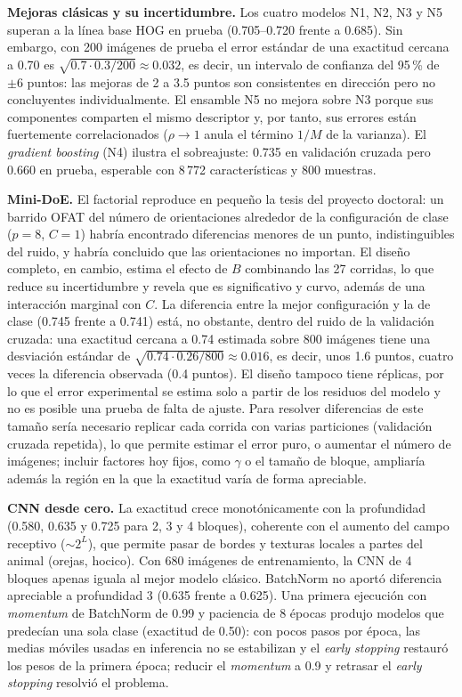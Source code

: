 \documentclass[conference]{IEEEtran}
\begin{document}
\textbf{Mejoras clásicas y su incertidumbre.} Los cuatro modelos N1, N2, N3 y N5 superan a la línea base HOG en prueba (0.705--0.720 frente a 0.685). Sin embargo, con 200 imágenes de prueba el error estándar de una exactitud cercana a 0.70 es $\sqrt{0.7\cdot0.3/200}\approx0.032$, es decir, un intervalo de confianza del 95\,\% de $\pm6$ puntos: las mejoras de 2 a 3.5 puntos son consistentes en dirección pero no concluyentes individualmente. El ensamble N5 no mejora sobre N3 porque sus componentes comparten el mismo descriptor y, por tanto, sus errores están fuertemente correlacionados ($\rho\to1$ anula el término $1/M$ de la varianza). El \emph{gradient boosting} (N4) ilustra el sobreajuste: 0.735 en validación cruzada pero 0.660 en prueba, esperable con 8\,772 características y 800 muestras.

\textbf{Mini-DoE.} El factorial reproduce en pequeño la tesis del proyecto doctoral: un barrido OFAT del número de orientaciones alrededor de la configuración de clase ($p=8$, $C=1$) habría encontrado diferencias menores de un punto, indistinguibles del ruido, y habría concluido que las orientaciones no importan. El diseño completo, en cambio, estima el efecto de $B$ combinando las 27 corridas, lo que reduce su incertidumbre y revela que es significativo y curvo, además de una interacción marginal con $C$. La diferencia entre la mejor configuración y la de clase (0.745 frente a 0.741) está, no obstante, dentro del ruido de la validación cruzada: una exactitud cercana a 0.74 estimada sobre 800 imágenes tiene una desviación estándar de $\sqrt{0.74\cdot0.26/800}\approx0.016$, es decir, unos 1.6 puntos, cuatro veces la diferencia observada (0.4 puntos). El diseño tampoco tiene réplicas, por lo que el error experimental se estima solo a partir de los residuos del modelo y no es posible una prueba de falta de ajuste. Para resolver diferencias de este tamaño sería necesario replicar cada corrida con varias particiones (validación cruzada repetida), lo que permite estimar el error puro, o aumentar el número de imágenes; incluir factores hoy fijos, como $\gamma$ o el tamaño de bloque, ampliaría además la región en la que la exactitud varía de forma apreciable.

\textbf{CNN desde cero.} La exactitud crece monotónicamente con la profundidad (0.580, 0.635 y 0.725 para 2, 3 y 4 bloques), coherente con el aumento del campo receptivo ($\sim2^L$), que permite pasar de bordes y texturas locales a partes del animal (orejas, hocico). Con 680 imágenes de entrenamiento, la CNN de 4 bloques apenas iguala al mejor modelo clásico. BatchNorm no aportó diferencia apreciable a profundidad 3 (0.635 frente a 0.625). Una primera ejecución con \emph{momentum} de BatchNorm de 0.99 y paciencia de 8 épocas produjo modelos que predecían una sola clase (exactitud de 0.50): con pocos pasos por época, las medias móviles usadas en inferencia no se estabilizan y el \emph{early stopping} restauró los pesos de la primera época; reducir el \emph{momentum} a 0.9 y retrasar el \emph{early stopping} resolvió el problema.
\end{document}
